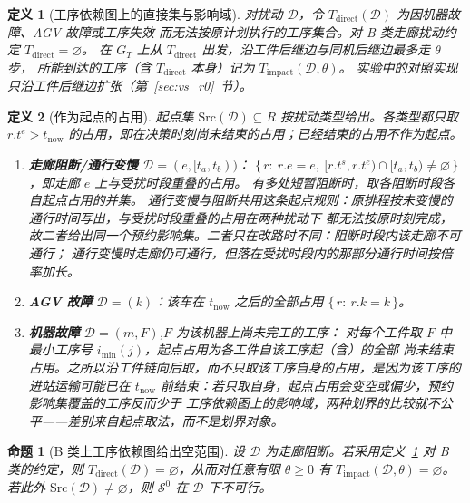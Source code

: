 \documentclass[manuscript,screen,review]{acmart}
\newtheorem{definition}{定义}
\newtheorem{prop}{命题}
\begin{document}
\begin{definition}[工序依赖图上的直接集与影响域]
\label{def:task_impact}
对扰动 \(\mathcal{D}\)，令 \(T_{\mathrm{direct}}(\mathcal{D})\) 为因机器故障、AGV 故障或工序失效
而无法按原计划执行的工序集合。对 B 类走廊扰动约定 \(T_{\mathrm{direct}}=\varnothing\)。
在 \(G_T\) 上从 \(T_{\mathrm{direct}}\) 出发，沿工件后继边与同机后继边最多走 \(\theta\) 步，
所能到达的工序（含 \(T_{\mathrm{direct}}\) 本身）记为 \(T_{\mathrm{impact}}(\mathcal{D},\theta)\)。
实验中的对照实现只沿工件后继边扩张（第~\ref{sec:vs_r0}~节）。
\end{definition}

\begin{definition}[作为起点的占用]
\label{def:seeds}
起点集 \(\mathrm{Src}(\mathcal{D})\subseteq R\) 按扰动类型给出。各类型都只取
\(r.t^e>t_{\mathrm{now}}\) 的占用，即在决策时刻尚未结束的占用；已经结束的占用不作为起点。
\begin{enumerate}[label=(\alph*),leftmargin=1.6em,itemsep=0.15em]
\item \textbf{走廊阻断/通行变慢} \(\mathcal{D}=(e,[t_a,t_b))\)：
\(\{\,r:\ r.e=e,\ [r.t^s,r.t^e)\cap[t_a,t_b)\neq\varnothing\,\}\)，即走廊 \(e\) 上与受扰时段重叠的占用。
有多处短暂阻断时，取各阻断时段各自起点占用的并集。
通行变慢与阻断共用这条起点规则：原排程按未变慢的通行时间写出，与受扰时段重叠的占用在两种扰动下
都无法按原时刻完成，故二者给出同一个预约影响集。二者只在改路时不同：阻断时段内该走廊不可通行；
通行变慢时走廊仍可通行，但落在受扰时段内的那部分通行时间按倍率加长。
\item \textbf{AGV 故障} \(\mathcal{D}=(k)\)：该车在 \(t_{\mathrm{now}}\) 之后的全部占用
\(\{\,r:\ r.k=k\,\}\)。
\item \textbf{机器故障} \(\mathcal{D}=(m,F)\),\(F\) 为该机器上尚未完工的工序：
对每个工件取 \(F\) 中最小工序号 \(i_{\min}(j)\)，起点占用为各工件自该工序起（含）的全部
尚未结束占用。之所以沿工件链向后取，而不只取该工序自身的占用，是因为该工序的进站运输可能已在
\(t_{\mathrm{now}}\) 前结束：若只取自身，起点占用会变空或偏少，预约影响集覆盖的工序反而少于
工序依赖图上的影响域，两种划界的比较就不公平——差别来自起点取法，而不是划界对象。
\end{enumerate}
\end{definition}

\begin{prop}[B 类上工序依赖图给出空范围]
\label{prop:miss}
设 \(\mathcal{D}\) 为走廊阻断。若采用定义~\ref{def:task_impact} 对 B 类的约定，则
\(T_{\mathrm{direct}}(\mathcal{D})=\varnothing\)，从而对任意有限 \(\theta\ge 0\) 有
\(T_{\mathrm{impact}}(\mathcal{D},\theta)=\varnothing\)。
若此外 \(\mathrm{Src}(\mathcal{D})\neq\varnothing\)，则 \(\mathcal{S}^0\) 在 \(\mathcal{D}\) 下不可行。
\end{prop}
\end{document}
